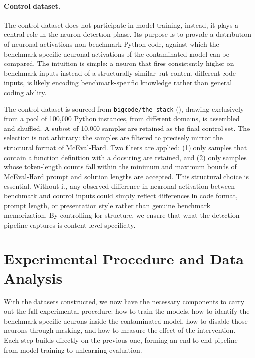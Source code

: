 \documentclass[mscthesis]{usiinfthesis}
\begin{document}
\paragraph{Control dataset.}
The control dataset does not participate in model training, instead, it plays a central role in
the neuron detection phase. Its purpose is to provide a distribution of neuronal activations non-benchmark Python code,
against which the benchmark-specific neuronal activations of the contaminated model can be
compared. The intuition is simple: a neuron that fires consistently higher on benchmark
inputs instead of a structurally similar but content-different code inputs, is likely encoding
benchmark-specific knowledge rather than general coding ability.
\par\vspace{1em} 
The control dataset is sourced from \texttt{bigcode/the-stack} (\citet{kocetkov2022stack3tbpermissively}), drawing exclusively from
a pool of 100,000 Python instances, from different domains, is assembled and shuffled.
A subset of 10,000 samples are retained as the final control set. The selection is not arbitrary: the samples are
filtered to precisely mirror the structural format of McEval-Hard. Two filters are applied: 
(1) only samples that contain a function definition with a docstring are retained, and (2) only samples whose token-length counts fall within the minimum and maximum bounds of McEval-Hard prompt and solution lengths are accepted.
This structural choice is essential. Without it, any observed difference in neuronal activation between benchmark and control inputs could
simply reflect differences in code format, prompt length, or presentation style rather than
genuine benchmark memorization. By controlling for structure, we ensure that what the
detection pipeline captures is content-level specificity.

\section{Experimental Procedure and Data Analysis}
With the datasets constructed, we now have the necessary components to carry out the full experimental procedure:
how to train the models, how to identify the benchmark-specific neurons inside the contaminated model, how
to disable those neurons through masking, and how to measure the effect of the intervention. Each step
builds directly on the previous one, forming an end-to-end pipeline from model training to
unlearning evaluation.
 
\end{document}

